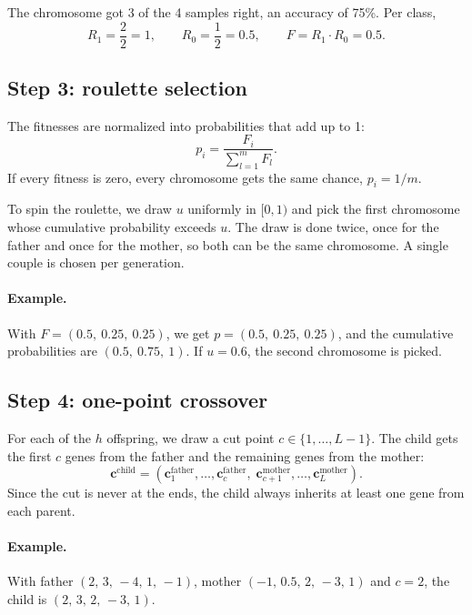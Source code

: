 \documentclass[11pt,a4paper]{article}
\newcommand{\chrom}{\mathbf{c}}
\begin{document}
The chromosome got 3 of the 4 samples right, an accuracy of 75\%. Per class,
\begin{equation*}
  R_1 = \frac{2}{2} = 1, \qquad R_0 = \frac{1}{2} = 0.5, \qquad
  F = R_1 \cdot R_0 = 0.5.
\end{equation*}

\subsection*{Step 3: roulette selection}

The fitnesses are normalized into probabilities that add up to 1:
\begin{equation}
  p_i = \frac{F_i}{\sum_{l=1}^{m} F_l}.
\end{equation}
If every fitness is zero, every chromosome gets the same chance, $p_i = 1/m$.

To spin the roulette, we draw $u$ uniformly in $[0, 1)$ and pick the first chromosome
whose cumulative probability exceeds $u$. The draw is done twice, once for the father
and once for the mother, so both can be the same chromosome. A single couple is chosen
per generation.

\paragraph{Example.} With $F = (0.5,\ 0.25,\ 0.25)$, we get
$p = (0.5,\ 0.25,\ 0.25)$, and the cumulative probabilities are
$(0.5,\ 0.75,\ 1)$. If $u = 0.6$, the second chromosome is picked.

\subsection*{Step 4: one-point crossover}

For each of the $h$ offspring, we draw a cut point $c \in \{1, \dots, L-1\}$. The
child gets the first $c$ genes from the father and the remaining genes from the
mother:
\begin{equation}
  \chrom^{\text{child}} =
  (\chrom^{\text{father}}_{1}, \dots, \chrom^{\text{father}}_{c},\;
   \chrom^{\text{mother}}_{c+1}, \dots, \chrom^{\text{mother}}_{L}).
\end{equation}
Since the cut is never at the ends, the child always inherits at least one gene from
each parent.

\paragraph{Example.} With father $(2,\, 3,\, -4,\, 1,\, -1)$, mother
$(-1,\, 0.5,\, 2,\, -3,\, 1)$ and $c = 2$, the child is $(2,\, 3,\, 2,\, -3,\, 1)$.
\end{document}
